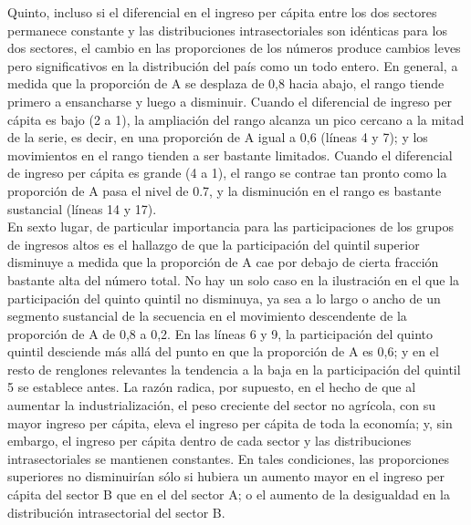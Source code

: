 Quinto, incluso si el diferencial en el ingreso per cápita entre los dos sectores permanece constante y las distribuciones intrasectoriales son idénticas para los dos sectores, el cambio en las proporciones de los números produce cambios leves pero significativos en la distribución del país como un todo entero. En general, a medida que la proporción de A se desplaza de 0,8 hacia abajo, el rango tiende primero a ensancharse y luego a disminuir. Cuando el diferencial de ingreso per cápita es bajo (2 a 1), la ampliación del rango alcanza un pico cercano a la mitad de la serie, es decir, en una proporción de A igual a 0,6 (líneas 4 y 7); y los movimientos en el rango tienden a ser bastante limitados. Cuando el diferencial de ingreso per cápita es grande (4 a 1), el rango se contrae tan pronto como la proporción de A pasa el nivel de 0.7, y la disminución en el rango es bastante sustancial (líneas 14 y 17).\\

En sexto lugar, de particular importancia para las participaciones de los grupos de ingresos altos es el hallazgo de que la participación del quintil superior disminuye a medida que la proporción de A cae por debajo de cierta fracción bastante alta del número total. No hay un solo caso en la ilustración en el que la participación del quinto quintil no disminuya, ya sea a lo largo o ancho de un segmento sustancial de la secuencia en el movimiento descendente de la proporción de A de 0,8 a 0,2. En las líneas 6 y 9, la participación del quinto quintil desciende más allá del punto en que la proporción de A es 0,6; y en el resto de renglones relevantes la tendencia a la baja en la participación del quintil 5 se establece antes. La razón radica, por supuesto, en el hecho de que al aumentar la industrialización, el peso creciente del sector no agrícola, con su mayor ingreso per cápita, eleva el ingreso per cápita de toda la economía; y, sin embargo, el ingreso per cápita dentro de cada sector y las distribuciones intrasectoriales se mantienen constantes. En tales condiciones, las proporciones superiores no disminuirían sólo si hubiera un aumento mayor en el ingreso per cápita del sector B que en el del sector A; o el aumento de la desigualdad en la distribución intrasectorial del sector B.\\

